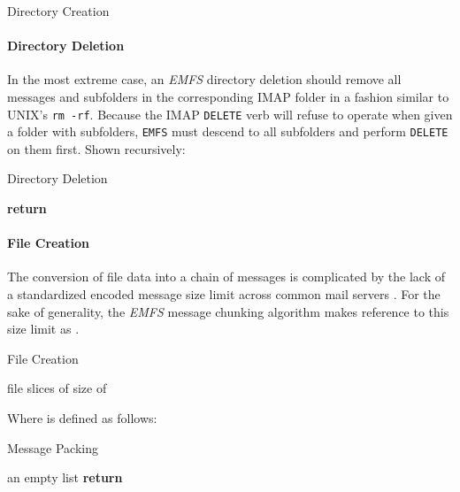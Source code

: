 \documentclass[12pt]{article}
\begin{document}
\begin{algorithm}
\caption{Directory Creation}
\begin{algorithmic}[1]
\State 
\State 
\For{}
\If{}
\State 
\EndIf
\State 
\EndFor
\EndProcedure
\end{algorithmic}
\end{algorithm}

\paragraph{Directory Deletion}

In the most extreme case, an \textit{EMFS} directory deletion should remove
all messages and subfolders in the corresponding IMAP folder in a fashion
similar to UNIX's \texttt{rm -rf}. Because the IMAP \texttt{DELETE} verb
will refuse to operate when given a folder with subfolders, \texttt{EMFS} must
descend to all subfolders and perform \texttt{DELETE} on them first. Shown
recursively:

\begin{algorithm}
\caption{Directory Deletion}
\begin{algorithmic}[1]
\State 
\If{}
\State 
\State \textbf{return}
\Else
\For{}
\State 
\EndFor
\EndIf
\EndProcedure
\end{algorithmic}
\end{algorithm}

\paragraph{File Creation}

The conversion of file data into a chain of messages is complicated by the lack
of a standardized encoded message size limit across common mail servers
\cite{google:01, yahoo:01, microsoft:01}. For the sake of generality, the
\textit{EMFS} message chunking algorithm makes reference to this size limit as
.

\begin{algorithm}
\caption{File Creation}
\begin{algorithmic}[1]
\State 
\State  file slices of size  of 
\State 
\For{}
\State 
\EndFor
\EndProcedure
\end{algorithmic}
\end{algorithm}

Where  is defined as follows:

\begin{algorithm}
\caption{Message Packing}
\begin{algorithmic}[1]
\State  an empty list
\State 
\For{}
\State 
\State 
\If{}
\State 
\EndIf
\State 
\State 
\EndFor
\State \textbf{return} 
\EndProcedure
\end{algorithmic}
\end{algorithm}
\end{document}
